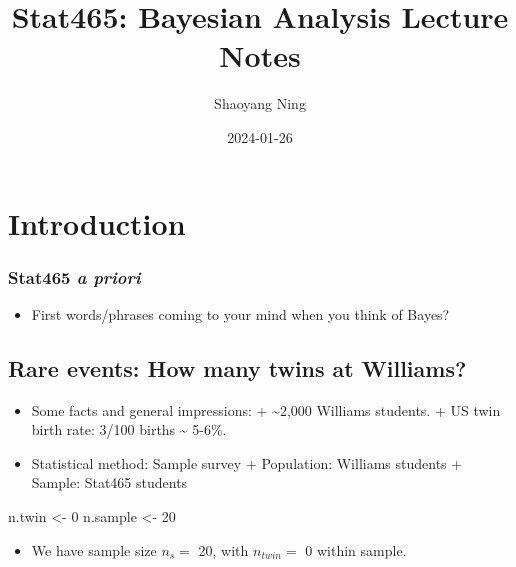 \documentclass[
]{book}
\title{Stat465: Bayesian Analysis Lecture Notes}
\author{Shaoyang Ning}
\date{2024-01-26}
\newenvironment{Shaded}{\begin{snugshade}}{\end{snugshade}}
\newcommand{\DecValTok}[1]{\textcolor[rgb]{0.00,0.00,0.81}{#1}}
\newcommand{\NormalTok}[1]{#1}
\newcommand{\OtherTok}[1]{\textcolor[rgb]{0.56,0.35,0.01}{#1}}
\providecommand{\tightlist}{%
  \setlength{\itemsep}{0pt}\setlength{\parskip}{0pt}}
\begin{document}
\maketitle

{
\setcounter{tocdepth}{1}
\tableofcontents
}
\hypertarget{introduction}{%
\chapter{Introduction}\label{introduction}}

\hypertarget{stat465-a-priori}{%
\subsection*{\texorpdfstring{Stat465 \emph{a priori}}{Stat465 a priori}}\label{stat465-a-priori}}

\begin{itemize}
\tightlist
\item
  First words/phrases coming to your mind when you think of Bayes?
\end{itemize}

\hypertarget{rare-events-how-many-twins-at-williams}{%
\section*{Rare events: How many twins at Williams?}\label{rare-events-how-many-twins-at-williams}}

\begin{itemize}
\item
  Some facts and general impressions:
  + \textasciitilde2,000 Williams students.
  + US twin birth rate: 3/100 births \textasciitilde{} 5-6\%.
\item
  Statistical method: Sample survey
  + Population: Williams students
  + Sample: Stat465 students
\end{itemize}

\begin{Shaded}
\begin{Highlighting}[]
\NormalTok{n.twin }\OtherTok{\textless{}{-}} \DecValTok{0}
\NormalTok{n.sample }\OtherTok{\textless{}{-}} \DecValTok{20}
\end{Highlighting}
\end{Shaded}

\begin{itemize}
\tightlist
\item
  We have sample size \(n_{s}=\) 20, with \(n_{twin}=\) 0 within sample.
\end{itemize}
\end{document}
